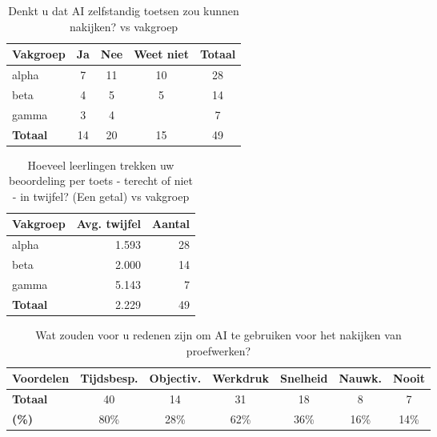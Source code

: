 \documentclass[12pt]{article}
\begin{document}
\noindent
\begin{table}[H]
    \caption{Denkt u dat AI zelfstandig toetsen zou kunnen nakijken? vs vakgroep}

    \begin{tabular}{l c c c c}
        \toprule
        \textbf{Vakgroep} & \textbf{Ja} & \textbf{Nee} & \textbf{Weet niet} & \textbf{Totaal} \\
        \midrule
        alpha & 7  & 11 & 10 & 28 \\
        beta  & 4  & 5  & 5  & 14 \\
        gamma & 3  & 4  &    & 7  \\
        \midrule
        \textbf{Totaal} & 14 & 20 & 15 & 49 \\
        \bottomrule
    \end{tabular}
\end{table}

\noindent
\begin{table}[H]
    \caption{Hoeveel leerlingen trekken uw beoordeling per toets - terecht of niet - in twijfel? (Een getal) vs vakgroep}
    \begin{tabular}{l r r}
        \toprule
        \textbf{Vakgroep} & \textbf{Avg. twijfel} & \textbf{Aantal} \\
        \midrule
        alpha & 1.593 & 28 \\
        beta  & 2.000 & 14 \\
        gamma & 5.143 & 7 \\
        \midrule
        \textbf{Totaal} & 2.229 & 49 \\
        \bottomrule
    \end{tabular}
\end{table}

\noindent
\begin{table}[H]
    \caption{Wat zouden voor u redenen zijn om AI te gebruiken voor het nakijken van proefwerken? }
    \begin{tabular}{l c c c c c c}
        \toprule
        \textbf{Voordelen} & \textbf{Tijdsbesp.} & \textbf{Objectiv.} & \textbf{Werkdruk} & \textbf{Snelheid} & \textbf{Nauwk.} & \textbf{Nooit} \\
        \midrule
        \textbf{Totaal} & 40 & 14 & 31 & 18 & 8 & 7 \\
        \bottomrule
        \textbf{(\%)} & 80\% & 28\% & 62\% & 36\% & 16\% & 14\% \\
        \bottomrule
    \end{tabular}
\end{table}
\end{document}
